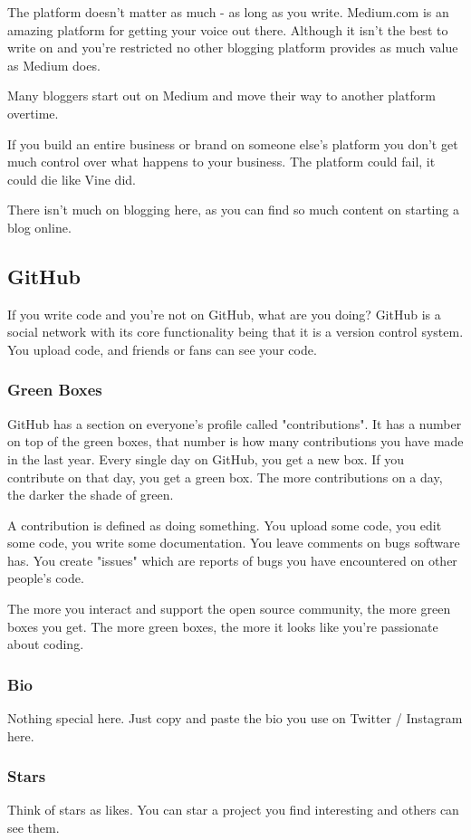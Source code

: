 \documentclass{article}
\begin{document}
The platform doesn't matter as much - as long as you write. Medium.com
is an amazing platform for getting your voice out there. Although it
isn't the best to write on and you're restricted no other blogging
platform provides as much value as Medium does.

Many bloggers start out on Medium and move their way to another platform
overtime.

If you build an entire business or brand on someone else's platform you
don't get much control over what happens to your business. The platform
could fail, it could die like Vine did.

There isn't much on blogging here, as you can find so much content on
starting a blog online.
\subsection{GitHub}
If you write code and you're not on GitHub, what are you doing? GitHub
is a social network with its core functionality being that it is a
version control system. You upload code, and friends or fans can see
your code.
\subsubsection{Green Boxes}
GitHub has a section on everyone's profile called "contributions". It
has a number on top of the green boxes, that number is how many
contributions you have made in the last year. Every single day on
GitHub, you get a new box. If you contribute on that day, you get a
green box. The more contributions on a day, the darker the shade of
green.

A contribution is defined as doing something. You upload some code, you
edit some code, you write some documentation. You leave comments on bugs
software has. You create "issues" which are reports of bugs you have
encountered on other people's code.

The more you interact and support the open source community, the more
green boxes you get. The more green boxes, the more it looks like you're
passionate about coding.
\subsubsection{Bio}
Nothing special here. Just copy and paste the bio you use on Twitter /
Instagram here.
\subsubsection{Stars}
Think of stars as likes. You can star a project you find interesting and
others can see them.
\end{document}
